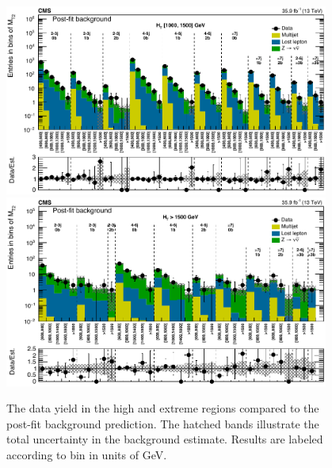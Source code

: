\begin{figure}
	\centering
	\includegraphics[width=0.95\textwidth]{results/figs/postfit/mt2_highHT_fullEstimate}
	\includegraphics[width=0.95\textwidth]{results/figs/postfit/mt2_extremeHT_fullEstimate}
	\renewcommand{\baselinestretch}{1.0}
	\caption[The data yield in the high \HT and extreme \HT regions compared to the post-fit background prediction.]{The data yield in the high \HT and extreme \HT regions compared to the post-fit background prediction. The hatched bands illustrate the total uncertainty in the background estimate. Results are labeled according to \mttwo bin in units of GeV.}
	\label{fig:yieldPostfit3}
\end{figure}
